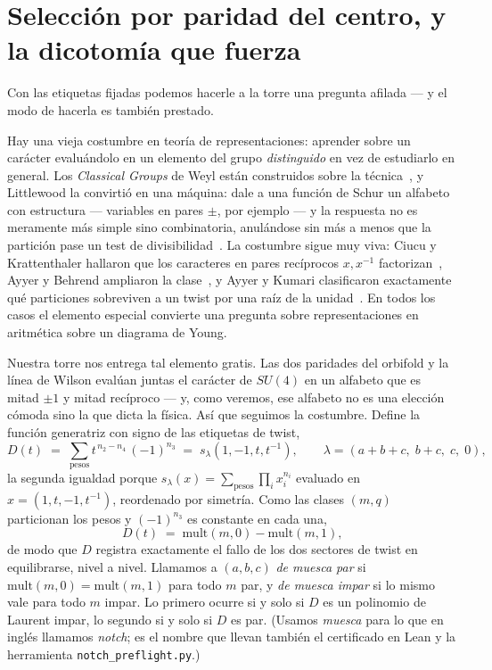 \documentclass[11pt,a4paper]{article}
\begin{document}
\section{Selección por paridad del centro, y la dicotomía que fuerza}\label{sec:dichotomy}
Con las etiquetas fijadas podemos hacerle a la torre una pregunta afilada --- y el modo de
hacerla es también prestado.

Hay una vieja costumbre en teoría de representaciones: aprender sobre un carácter evaluándolo
en un elemento del grupo \emph{distinguido} en vez de estudiarlo en general. Los
\emph{Classical Groups} de Weyl están construidos sobre la técnica~\cite{Weyl}, y Littlewood
la convirtió en una máquina: dale a una función de Schur un alfabeto con estructura ---
variables en pares $\pm$, por ejemplo --- y la respuesta no es meramente más simple sino
combinatoria, anulándose sin más a menos que la partición pase un test de
divisibilidad~\cite{LittlewoodBook}. La costumbre sigue muy viva: Ciucu y Krattenthaler
hallaron que los caracteres en pares recíprocos $x,x^{-1}$
factorizan~\cite{CiucuKrattenthaler}, Ayyer y Behrend ampliaron la
clase~\cite{AyyerBehrend}, y Ayyer y Kumari clasificaron exactamente qué particiones
sobreviven a un twist por una raíz de la unidad~\cite{AyyerKumari,Kumari}. En todos los casos
el elemento especial convierte una pregunta sobre representaciones en aritmética sobre un
diagrama de Young.

Nuestra torre nos entrega tal elemento gratis. Las dos paridades del orbifold y la línea de
Wilson evalúan juntas el carácter de $SU(4)$ en un alfabeto que es mitad $\pm1$ y mitad
recíproco --- y, como veremos, ese alfabeto no es una elección cómoda sino la que dicta la
física. Así que seguimos la costumbre. Define la función generatriz con signo de las etiquetas
de twist,
\begin{equation}\label{eq:D}
D(t)\;=\;\sum_{\text{pesos}} t^{\,n_2-n_4}\,(-1)^{n_3}\;=\;s_\lambda\!\left(1,-1,t,t^{-1}\right),
\qquad \lambda=(a{+}b{+}c,\;b{+}c,\;c,\;0),
\end{equation}
la segunda igualdad porque $s_\lambda(x)=\sum_{\text{pesos}}\prod_i x_i^{n_i}$ evaluado en
$x=(1,t,-1,t^{-1})$, reordenado por simetría. Como las clases $(m,q)$ particionan los pesos y
$(-1)^{n_3}$ es constante en cada una,
\begin{equation}
[t^m]\,D(t)\;=\;\mathrm{mult}(m,0)-\mathrm{mult}(m,1),
\end{equation}
de modo que $D$ registra exactamente el fallo de los dos sectores de twist en equilibrarse,
nivel a nivel. Llamamos a $(a,b,c)$ \emph{de muesca par} si $\mathrm{mult}(m,0)=\mathrm{mult}(m,1)$
para todo $m$ par, y \emph{de muesca impar} si lo mismo vale para todo $m$ impar. Lo primero
ocurre si y solo si $D$ es un polinomio de Laurent impar, lo segundo si y solo si $D$ es par.
(Usamos \emph{muesca} para lo que en inglés llamamos \emph{notch}; es el nombre que llevan
también el certificado en Lean y la herramienta \texttt{notch\_preflight.py}.)
\end{document}
